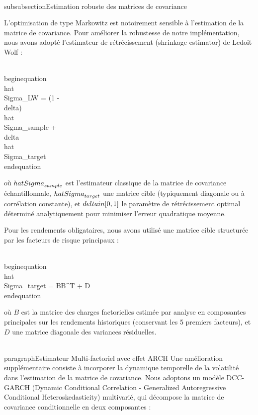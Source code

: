 \\subsubsection{Estimation robuste des matrices de covariance}

L'optimisation de type Markowitz est notoirement sensible à l'estimation de la matrice de covariance. Pour améliorer la robustesse de notre implémentation, nous avons adopté l'estimateur de rétrécissement (shrinkage estimator) de Ledoit-Wolf :

\\begin{equation}
\\hat{\\Sigma}_{LW} = (1 - \\delta) \\hat{\\Sigma}_{sample} + \\delta \\hat{\\Sigma}_{target}
\\end{equation}

où $\\hat{\\Sigma}_{sample}$ est l'estimateur classique de la matrice de covariance échantillonnale, $\\hat{\\Sigma}_{target}$ une matrice cible (typiquement diagonale ou à corrélation constante), et $\\delta \\in [0,1]$ le paramètre de rétrécissement optimal déterminé analytiquement pour minimiser l'erreur quadratique moyenne.

Pour les rendements obligataires, nous avons utilisé une matrice cible structurée par les facteurs de risque principaux :

\\begin{equation}
\\hat{\\Sigma}_{target} = BB^T + D
\\end{equation}

où $B$ est la matrice des charges factorielles estimée par analyse en composantes principales sur les rendements historiques (conservant les 5 premiers facteurs), et $D$ une matrice diagonale des variances résiduelles.

\\paragraph{Estimateur Multi-factoriel avec effet ARCH}
Une amélioration supplémentaire consiste à incorporer la dynamique temporelle de la volatilité dans l'estimation de la matrice de covariance. Nous adoptons un modèle DCC-GARCH (Dynamic Conditional Correlation - Generalized Autoregressive Conditional Heteroskedasticity) multivarié, qui décompose la matrice de covariance conditionnelle en deux composantes :

